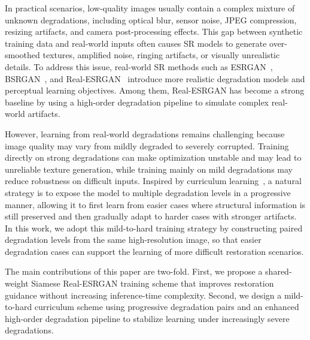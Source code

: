 \documentclass[runningheads]{llncs}
\begin{document}
In practical scenarios, low-quality images usually contain a complex mixture of unknown degradations, including optical blur, sensor noise, JPEG compression, resizing artifacts, and camera post-processing effects. This gap between synthetic training data and real-world inputs often causes SR models to generate over-smoothed textures, amplified noise, ringing artifacts, or visually unrealistic details. To address this issue, real-world SR methods such as ESRGAN~\cite{wang2018esrgan}, BSRGAN~\cite{zhang2021designing}, and Real-ESRGAN~\cite{wang2021realesrgan} introduce more realistic degradation models and perceptual learning objectives. Among them, Real-ESRGAN has become a strong baseline by using a high-order degradation pipeline to simulate complex real-world artifacts.

However, learning from real-world degradations remains challenging because image quality may vary from mildly degraded to severely corrupted. Training directly on strong degradations can make optimization unstable and may lead to unreliable texture generation, while training mainly on mild degradations may reduce robustness on difficult inputs. Inspired by curriculum learning~\cite{Bengio09}, a natural strategy is to expose the model to multiple degradation levels in a progressive manner, allowing it to first learn from easier cases where structural information is still preserved and then gradually adapt to harder cases with stronger artifacts. In this work, we adopt this mild-to-hard training strategy by constructing paired degradation levels from the same high-resolution image, so that easier degradation cases can support the learning of more difficult restoration scenarios.

The main contributions of this paper are two-fold. First, we propose a shared-weight Siamese Real-ESRGAN training scheme that improves restoration guidance without increasing inference-time complexity. Second, we design a mild-to-hard curriculum scheme using progressive degradation pairs and an enhanced high-order degradation pipeline to stabilize learning under increasingly severe degradations.
\end{document}
